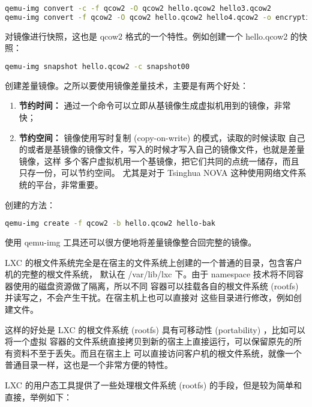 \begin{lstlisting}[language=bash]
qemu-img convert -c -f qcow2 -O qcow2 hello.qcow2 hello3.qcow2
qemu-img convert -f qcow2 -O qcow2 hello.qcow2 hello4.qcow2 -o encryption
\end{lstlisting}

对镜像进行快照，这也是 qcow2 格式的一个特性。例如创建一个 hello.qcow2 的快照：

\begin{lstlisting}[language=bash]
qemu-img snapshot hello.qcow2 -c snapshot00
\end{lstlisting}

创建差量镜像。之所以要使用镜像差量技术，主要是有两个好处：

\begin{enumerate}
    \item \textbf{节约时间：} 通过一个命令可以立即从基镜像生成虚拟机用到的镜像，非常快；
    \item \textbf{节约空间：} 镜像使用写时复制 (copy-on-write) 的模式，读取的时候读取
    自己的或者是基镜像的镜像文件，写入的时候才写入自己的镜像文件，也就是差量镜像，这样
    多个客户虚拟机用一个基镜像，把它们共同的点统一储存，而且只存一份，可以节约空间。
    尤其是对于 Tsinghua NOVA 这种使用网络文件系统的平台，非常重要。
\end{enumerate}

创建的方法：

\begin{lstlisting}[language=bash]
qemu-img create -f qcow2 -b hello.qcow2 hello-bak
\end{lstlisting}

使用 qemu-img 工具还可以很方便地将差量镜像整合回完整的镜像。


LXC 的根文件系统完全是在宿主的文件系统上创建的一个普通的目录，包含客户机的完整的根文件系统，
默认在 /var/lib/lxc 下。由于 namespace 技术将不同容器使用的磁盘资源做了隔离，所以不同
容器可以挂载各自的根文件系统 (rootfs) 并读写之，不会产生干扰。在宿主机上也可以直接对
这些目录进行修改，例如创建文件。

这样的好处是 LXC 的根文件系统 (rootfs) 具有可移动性 (portability) ，比如可以将一个虚拟
容器的文件系统直接拷贝到新的宿主上直接运行，可以保留原先的所有资料不至于丢失。而且在宿主上
可以直接访问客户机的根文件系统，就像一个普通目录一样，这也是一个非常方便的特性。

LXC 的用户态工具提供了一些处理根文件系统 (rootfs) 的手段，但是较为简单和直接，举例如下：

